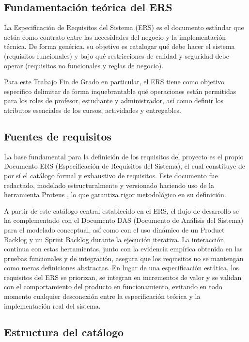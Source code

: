 \subsection{Fundamentaci\'on te\'orica del ERS}
La Especificaci\'on de Requisitos del Sistema (ERS) es el documento est\'andar que act\'ua como contrato entre las necesidades del negocio y la implementaci\'on t\'ecnica. De forma gen\'erica, su objetivo es catalogar qu\'e debe hacer el sistema (requisitos funcionales) y bajo qu\'e restricciones de calidad y seguridad debe operar (requisitos no funcionales y reglas de negocio). 

Para este Trabajo Fin de Grado en particular, el ERS tiene como objetivo espec\'ifico delimitar de forma inquebrantable qu\'e operaciones est\'an permitidas para los roles de profesor, estudiante y administrador, as\'i como definir los atributos esenciales de los cursos, actividades y entregables.



\subsection{Fuentes de requisitos}

La base fundamental para la definici\'on de los requisitos del proyecto es el propio Documento ERS (Especificaci\'on de Requisitos del Sistema), el cual constituye de por s\'i el cat\'alogo formal y exhaustivo de requisitos. Este documento fue redactado, modelado estructuralmente y versionado haciendo uso de la herramienta Proteus \cite{proteus}, lo que garantiza rigor metodol\'ogico en su definici\'on.

A partir de este cat\'alogo central establecido en el ERS, el flujo de desarrollo se ha complementado con el Documento DAS (Documento de An\'alisis del Sistema) para el modelado conceptual, as\'i como con el uso din\'amico de un Product Backlog y un Sprint Backlog durante la ejecuci\'on iterativa. La interacci\'on continua con estas herramientas, junto con la evidencia emp\'irica obtenida en las pruebas funcionales y de integraci\'on, asegura que los requisitos no se mantengan como meras definiciones abstractas. En lugar de una especificaci\'on est\'atica, los requisitos del ERS se priorizan, se integran en incrementos de valor y se validan con el comportamiento del producto en funcionamiento, evitando en todo momento cualquier desconexi\'on entre la especificaci\'on te\'orica y la implementaci\'on real del sistema.

\subsection{Estructura del cat\'alogo}

